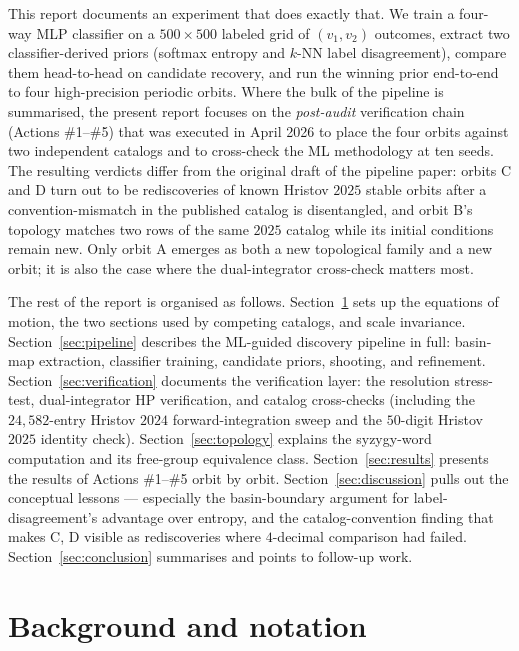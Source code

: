 \documentclass[11pt]{article}
\begin{document}
This report documents an experiment that does exactly that. We train a
four-way MLP classifier on a $500\!\times\!500$ labeled grid of
$(v_1,v_2)$ outcomes, extract two classifier-derived priors (softmax
entropy and $k$-NN label disagreement), compare them head-to-head on
candidate recovery, and run the winning prior end-to-end to four
high-precision periodic orbits. Where the bulk of the pipeline is
summarised, the present report focuses on the \emph{post-audit}
verification chain (Actions \#1--\#5) that was executed in April 2026
to place the four orbits against two independent catalogs and to
cross-check the ML methodology at ten seeds. The resulting verdicts
differ from the original draft of the pipeline paper: orbits C and D
turn out to be rediscoveries of known Hristov $2025$ stable orbits
after a convention-mismatch in the published catalog is disentangled,
and orbit B's topology matches two rows of the same $2025$ catalog
while its initial conditions remain new. Only orbit A emerges as both a
new topological family and a new orbit; it is also the case where the
dual-integrator cross-check matters most.

The rest of the report is organised as follows.
Section~\ref{sec:background} sets up the equations of motion, the two
sections used by competing catalogs, and scale invariance.
Section~\ref{sec:pipeline} describes the ML-guided discovery pipeline
in full: basin-map extraction, classifier training, candidate priors,
shooting, and refinement. Section~\ref{sec:verification} documents the
verification layer: the resolution stress-test, dual-integrator HP
verification, and catalog cross-checks (including the $24{,}582$-entry
Hristov $2024$ forward-integration sweep and the $50$-digit Hristov
$2025$ identity check). Section~\ref{sec:topology} explains the
syzygy-word computation and its free-group equivalence class.
Section~\ref{sec:results} presents the results of Actions \#1--\#5
orbit by orbit. Section~\ref{sec:discussion} pulls out the conceptual
lessons --- especially the basin-boundary argument for
label-disagreement's advantage over entropy, and the catalog-convention
finding that makes C, D visible as rediscoveries where $4$-decimal
comparison had failed. Section~\ref{sec:conclusion} summarises and
points to follow-up work.

\section{Background and notation}
\label{sec:background}
\end{document}
